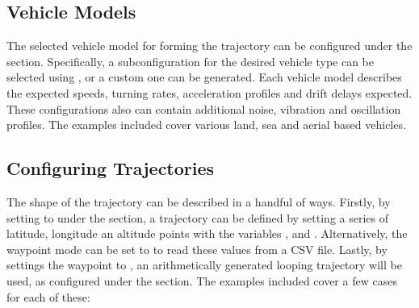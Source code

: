 \documentclass[letterpaper,10pt,english]{sphinxmanual}
\begin{document}
\subsection{Vehicle Models}
\label{\detokenize{usage/tutorials:vehicle-models}}
\sphinxAtStartPar
The selected vehicle model for forming the trajectory can be configured under the  section. Specifically, a
sub\sphinxhyphen{}configuration for the desired vehicle type can be selected using , or a custom one can be
generated. Each vehicle model describes the expected speeds, turning rates, acceleration profiles and drift delays
expected. These configurations also can contain additional noise, vibration and oscillation profiles. The examples
included cover various land, sea and aerial based vehicles.

\begin{sphinxVerbatim}[commandchars=\\\{\}]
\end{sphinxVerbatim}


\subsection{Configuring Trajectories}
\label{\detokenize{usage/tutorials:configuring-trajectories}}
\sphinxAtStartPar
The shape of the trajectory can be described in a handful of ways. Firstly, by setting  to 
under the  section, a trajectory can be defined by setting a series of latitude, longitude an altitude
points with the variables ,  and . Alternatively, the waypoint mode can
be set to  to read these values from a CSV file. Lastly, by settings the waypoint to , an
arithmetically generated looping trajectory will be used, as configured under the  section. The examples
included cover a few cases for each of these:
\end{document}
